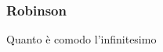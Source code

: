 \begin{frame}[label=Robinson]
  \frametitle{Robinson}
  \begin{block}{Quanto è comodo l'infinitesimo}
    
  \end{block}
\end{frame}
